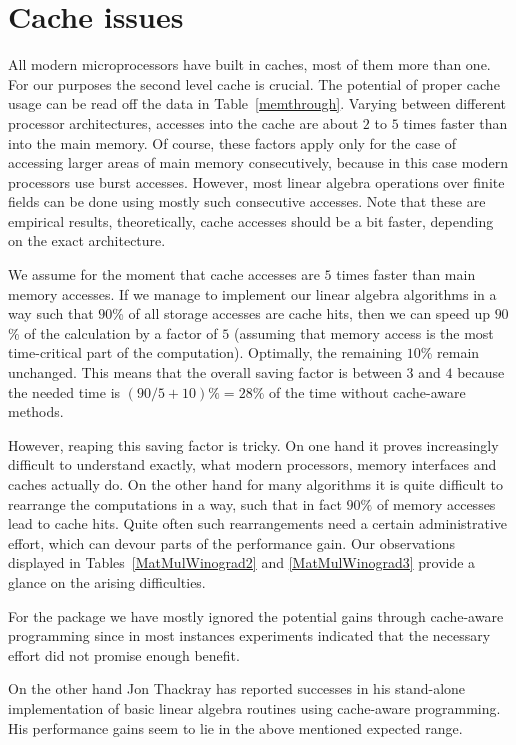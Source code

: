\section{Cache issues}
\label{sec:cache}
%
 
All modern microprocessors have built in caches, most of them more than
one. For our purposes the second level cache is crucial. The potential
of proper cache usage can be read off the data in
Table~\ref{memthrough}. Varying between different processor
architectures, accesses into the cache are about $2$ to $5$ times faster
than into the main memory. Of course, these factors apply only for the
case of accessing larger areas of main memory consecutively, because
in this case modern processors use burst accesses. However, most
linear algebra operations over finite fields can be done using mostly 
such consecutive accesses. Note that these are empirical results,
theoretically, cache accesses should be a bit faster, depending on the
exact architecture.

We assume for the moment that cache accesses are $5$ times faster
than main memory accesses. If we manage to implement our linear
algebra algorithms in a way such that $90$\% of all storage accesses
are cache hits, then we can speed up $90$\% of the calculation by a
factor of $5$ (assuming that memory access is the most time-critical
part of the computation). Optimally, the remaining $10$\% remain unchanged.
This means that the overall saving factor is between $3$ and $4$ because the
needed time is $(90/5+10)\% = 28\%$ of the time without cache-aware
methods. 

However, reaping this saving factor is tricky. On one hand it proves
increasingly difficult to understand exactly, what modern processors,
memory interfaces and caches actually do. On the other hand for many
algorithms it is quite difficult to rearrange the computations in a
way, such that in fact $90\%$ of memory accesses lead to cache hits.
Quite often such rearrangements need a certain administrative effort,
which can devour parts of the performance gain.
Our observations displayed in Tables~\ref{MatMulWinograd2} and
\ref{MatMulWinograd3} provide a glance on the arising difficulties.

For the {\cvec} package we have mostly ignored the potential gains
through cache-aware programming since in most instances experiments
indicated that the necessary effort did not promise enough benefit.

On the other hand Jon Thackray has reported successes in his
stand-alone implementation of basic linear algebra routines using
cache-aware programming. His performance gains seem to lie in the
above mentioned expected range.
 
